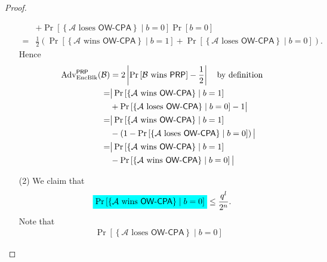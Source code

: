 \documentclass[12pt,openany]{book}
\newcommand{\mathcolorbox}[2]{\colorbox{#1}{$\displaystyle #2$}}
\theoremstyle{definition}
\newcommand{\set}[1]{\left\{#1\right\}}
\newcommand{\of}[1]{\left( #1 \right)}
\newcommand{\abs}[1]{\left\lvert #1 \right\rvert}
\newcommand{\A}{\mathcal{A}}
\newcommand{\OW}{\mathsf{OW}}
\newcommand{\PRP}{\mathsf{PRP}}
\newcommand{\CPA}{\mathsf{CPA}}
\newcommand{\Adv}{\textnormal{Adv}}
\begin{document}
\begin{proof}
\begin{enumerate}
\begin{align*}
					&+\Pr\left[\set{\text{$\A$ loses $\OW$-$\CPA$}}\mid b=0\right]\Pr[b=0]\\
					=&\frac{1}{2}\of{\Pr\left[\set{\text{$\A$ wins $\OW$-$\CPA$}}\mid b=1\right]+\Pr\left[\set{\text{$\A$ loses $\OW$-$\CPA$}}\mid b=0\right]}.
				\end{align*} Hence
				\begin{align*}
					\Adv_{\textnormal{EncBlk}}^{\PRP}(\mathcal{B})&=2\abs{\Pr\left[\text{$\mathcal{B}$ wins $\PRP$}\right]-\frac{1}{2}}\quad\text{by definition}\\
					=&\big|\Pr\left[\set{\text{$\A$ wins $\OW$-$\CPA$}}\mid b=1\right]\\
					&+\Pr\left[\set{\text{$\A$ loses $\OW$-$\CPA$}}\mid b=0\right]-1\big|\\
					=&\big|\Pr\left[\set{\text{$\A$ wins $\OW$-$\CPA$}}\mid b=1\right]\\
					&-\of{1-\Pr\left[\set{\text{$\A$ loses $\OW$-$\CPA$}}\mid b=0\right]}\big|\\
					=&\big|\Pr\left[\set{\text{$\A$ wins $\OW$-$\CPA$}}\mid b=1\right]\\
					&-\Pr\left[\set{\text{$\A$ wins $\OW$-$\CPA$}}\mid b=0\right]\big|
				\end{align*}
				\vspace{4pt}
			\item[(2)] We claim that \[
			\mathcolorbox{-red}{\Pr\left[\set{\text{$\A$ wins $\OW$-$\CPA$}}\mid b=0\right]}\leq\frac{q^l}{2^n}.
			\] Note that \begin{align*}
			\Pr[\set{\text{$\A$ loses $\OW$-$\CPA$}}\mid b=0]&
			\end{align*}
		\end{enumerate}
	\end{proof}

\end{document}
